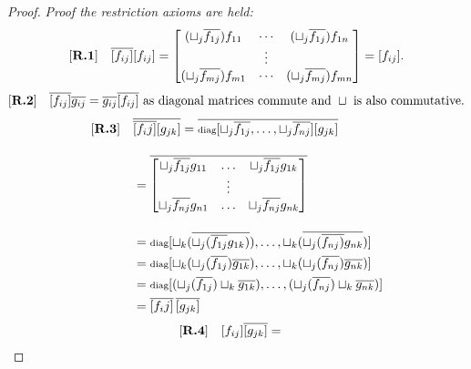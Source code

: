 \begin{proof}
  \emph{Proof the restriction axioms are held:}
  \begin{align*}
    [\text{\bfseries {R}.{1}}] \quad& \overline{[f_{ij}]}[f_{ij}] =
      \begin{bmatrix}
        (\sqcup_j \overline{f_{1j}}) f_{11} & \cdots & (\sqcup_j \overline{f_{1 j}}) f_{1n}\\
        & \vdots & \\
        (\sqcup_j \overline{f_{mj}}) f_{m1} & \cdots & (\sqcup_j \overline{f_{mj}}) f_{m n}
      \end{bmatrix} = [f_{ij}].\\
  \end{align*}
  \begin{align*}
    [\text{\bfseries {R}.{2}}] \quad & \overline{[f_{ij}]} \overline{g_{ij}} =  \overline{g_{ij}} \overline{[f_{ij}]}
      \text{ as diagonal matrices commute and }\sqcup\text{ is also commutative.}\\
  \end{align*}
  \begin{align*}
    [\text{\bfseries {R}.{3}}] \quad & \overline{\overline{[f_ij]}[g_{j k}]} =
      \overline{\operatorname{\scriptstyle{diag}}[\sqcup_j \overline{f_{1j}},\ldots,\sqcup_j \overline{f_{n j}}] [g_{j k}]}
      \\[10pt]
      & = \overline{\begin{bmatrix}
        \sqcup_j \overline{f_{1j}} g_{11} & \ldots & \sqcup_j \overline{f_{1 j}} g_{1 k}\\
        & \vdots & \\
        \sqcup_j \overline{f_{nj}} g_{n 1} & \ldots & \sqcup_j \overline{f_{n j}} g_{n k}\\
      \end{bmatrix}} \\[10pt]
      & = \operatorname{\scriptstyle{diag}}[\sqcup_k (\overline{\sqcup_j (\overline{f_{1j}} g_{1k})}), \ldots,
                 \sqcup_k (\overline{\sqcup_j(\overline{f_{nj})} g_{n k}})]\\
      & = \operatorname{\scriptstyle{diag}}[\sqcup_k (\sqcup_j(\overline{f_{1j}}) \overline{g_{1k}}), \ldots,
                 \sqcup_k (\sqcup_j(\overline{f_{nj}}) \overline{g_{n k}})]\\
      & = \operatorname{\scriptstyle{diag}}[(\sqcup_j(\overline{f_{1j}}) \sqcup_k  \overline{g_{1k}}), \ldots,
                 (\sqcup_j(\overline{f_{nj}}) \sqcup_k  \overline{g_{n k}})]\\
      & = \overline{[f_ij]}\,\overline{[g_{j k}]}\\
  \end{align*}
  \begin{align*}
      \rfour \quad & [f_{i\jay}]\rst{[g_{\jay k}]} =

\end{align*}
\end{proof}
